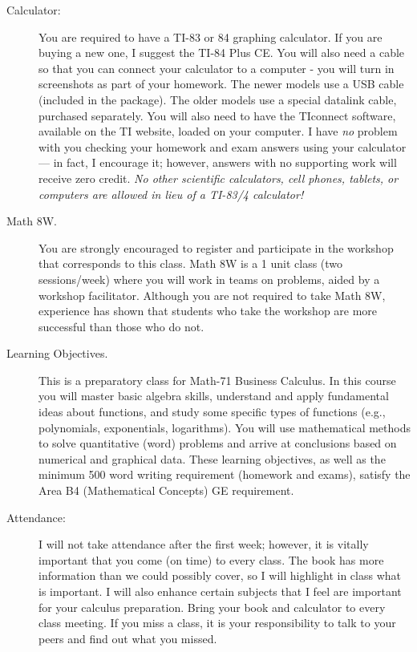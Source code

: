 \documentclass[letterpaper,12pt,fleqn]{article}
\begin{document}
\begin{description}
\item[Calculator:] You are required to have a TI-83 or 84 graphing calculator.
  If you are buying a new one, I suggest the TI-84 Plus CE. You will also need
  a cable so that you can connect your calculator to a computer - you will turn
  in screenshots as part of your homework. The newer models use a USB cable
  (included in the package). The older models use a special datalink cable,
  purchased separately. You will also need to have the TIconnect software,
  available on the TI website, loaded on your computer. I have \emph{no}
  problem with you checking your homework and exam
  answers using your calculator --- in fact, I encourage it; however,
  answers with no supporting work will receive zero credit.
  \emph{No other scientific calculators, cell phones, tablets, or computers
    are allowed in lieu of a TI-83/4 calculator!}

\item[Math 8W.] You are strongly encouraged to register and participate in the
  workshop that corresponds to this class.  Math 8W is a 1 unit class (two
  sessions/week) where you will work in teams on problems, aided by a workshop
  facilitator.  Although you are not required to take Math 8W, experience has
  shown that students who take the workshop are more successful than those who
  do not.

\item[Learning Objectives.] This is a preparatory class for Math-71 Business
  Calculus. In this course you will master basic algebra skills, understand and
  apply fundamental ideas about functions, and study some specific types of
  functions (e.g., polynomials, exponentials, logarithms).  You will use
  mathematical methods to solve quantitative (word) problems and arrive at
  conclusions based on numerical and graphical data.  These learning
  objectives, as well as the minimum 500 word writing requirement (homework
  and exams), satisfy the Area B4 (Mathematical Concepts) GE requirement.

\item[Attendance:] I will not take attendance after the first week; however, it
  is vitally important that you come (on time) to every class. The book has
  more information than we could possibly cover, so I will highlight in class
  what is important. I will also enhance certain subjects that I feel are
  important for your calculus preparation. Bring your book and calculator to
  every class meeting. If you miss a class, it is your responsibility to talk
  to your peers and find out what you missed.


\end{description}
\end{document}
